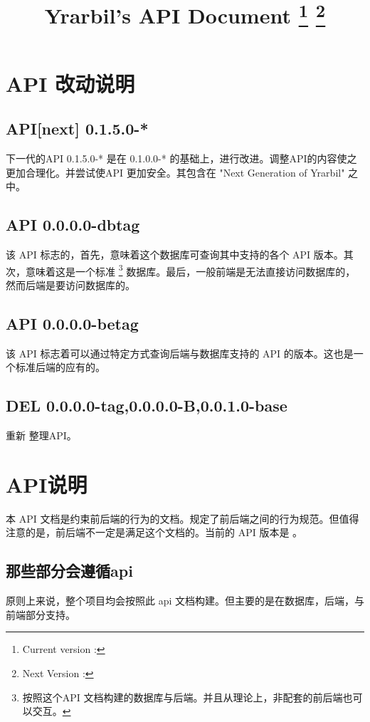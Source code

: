 \documentclass[UTF8]{article}
\title{Yrarbil's API Document \thanks{Current version : \apiver } \thanks{Next Version : \nextapiver }}
\begin{document}
    \maketitle
    \newpage
    
    
    \tableofcontents
    \newpage
    


    \section{API 改动说明}

    \subsection{API[next] 0.1.5.0-*}
    下一代的API 0.1.5.0-* 是在 0.1.0.0-* 的基础上，进行改进。调整API的内容使之更加合理化。并尝试使API 更加安全。其包含在 "Next Generation of Yrarbil" 之中。

    \subsection{API 0.0.0.0-dbtag}
    该 API 标志的，首先，意味着这个数据库可查询其中支持的各个 API 版本。其次，意味着这是一个标准
      \footnote{按照这个API 文档构建的数据库与后端。并且从理论上，非配套的前后端也可以交互。}
    数据库。最后，一般前端是无法直接访问数据库的，然而后端是要访问数据库的。

    \subsection{API 0.0.0.0-betag}
    该 API 标志着可以通过特定方式查询后端与数据库支持的 API 的版本。这也是一个标准后端的应有的。

    \subsection{DEL 0.0.0.0-tag,0.0.0.0-B,0.0.1.0-base}
    重新 整理API。

    \section{API说明}
    本 API 文档是约束前后端的行为的文档。规定了前后端之间的行为规范。但值得注意的是，前后端不一定是满足这个文档的。当前的 API 版本是 \apiver 。
    \subsection{那些部分会遵循api}
    原则上来说，整个项目均会按照此 api 文档构建。但主要的是在数据库，后端，与前端部分支持。
\end{document}
